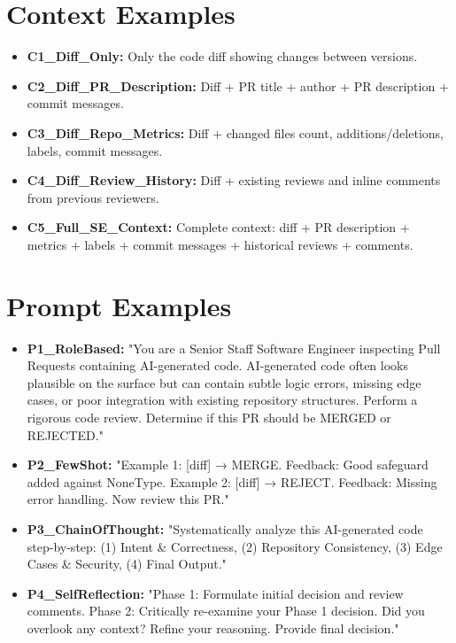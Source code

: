 \documentclass{experimentreport}
\begin{document}

\section*{Context Examples}

\begin{itemize}
\item \textbf{C1\_Diff\_Only:} Only the code diff showing changes between versions.
\item \textbf{C2\_Diff\_PR\_Description:} Diff + PR title + author + PR description + commit messages.
\item \textbf{C3\_Diff\_Repo\_Metrics:} Diff + changed files count, additions/deletions, labels, commit messages.
\item \textbf{C4\_Diff\_Review\_History:} Diff + existing reviews and inline comments from previous reviewers.
\item \textbf{C5\_Full\_SE\_Context:} Complete context: diff + PR description + metrics + labels + commit messages + historical reviews + comments.
\end{itemize}


\section*{Prompt Examples}

\begin{itemize}
\item \textbf{P1\_RoleBased:} "You are a Senior Staff Software Engineer inspecting Pull Requests containing AI-generated code. AI-generated code often looks plausible on the surface but can contain subtle logic errors, missing edge cases, or poor integration with existing repository structures. Perform a rigorous code review. Determine if this PR should be MERGED or REJECTED."

\item \textbf{P2\_FewShot:} "Example 1: [diff] → MERGE. Feedback: Good safeguard added against NoneType. Example 2: [diff] → REJECT. Feedback: Missing error handling. Now review this PR."

\item \textbf{P3\_ChainOfThought:} "Systematically analyze this AI-generated code step-by-step: (1) Intent \& Correctness, (2) Repository Consistency, (3) Edge Cases \& Security, (4) Final Output."

\item \textbf{P4\_SelfReflection:} "Phase 1: Formulate initial decision and review comments. Phase 2: Critically re-examine your Phase 1 decision. Did you overlook any context? Refine your reasoning. Provide final decision."
\end{itemize}
\end{document}
